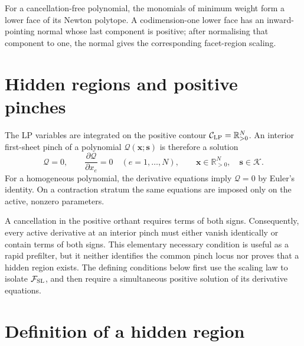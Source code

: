 \documentclass[a4paper,11pt]{article}
\newcommand{\x}{\boldsymbol{x}}
\newcommand{\s}{\boldsymbol{s}}
\newcommand{\K}{\mathcal K}
\newcommand{\FSL}{\mathcal F_{\rm SL}}
\begin{document}
For a cancellation-free polynomial, the monomials of minimum weight form a
lower face of its Newton polytope.  A codimension-one lower face has an
inward-pointing normal whose last component is positive; after normalising
that component to one, the normal gives the corresponding facet-region
scaling.

\section{Hidden regions and positive pinches}
\label{sec:pinch}

The LP variables are integrated on the positive contour
\(\mathcal C_{\rm LP}=\mathbb R_{>0}^{N}\).  An interior first-sheet pinch of
a polynomial \(\mathcal Q(\x;\s)\) is therefore a solution
\begin{equation}
 \mathcal Q=0,
 \qquad
 \frac{\partial\mathcal Q}{\partial x_e}=0
 \quad(e=1,\ldots,N),
 \qquad
 \x\in\mathbb R_{>0}^{N},\quad \s\in\K.
\label{eq:positive-pinch}
\end{equation}
For a homogeneous polynomial, the derivative equations imply
\(\mathcal Q=0\) by Euler's identity.  On a contraction stratum the same
equations are imposed only on the active, nonzero parameters.

A cancellation in the positive orthant requires terms of both signs.
Consequently, every active derivative at an interior pinch must either vanish
identically or contain terms of both signs.  This elementary necessary
condition is useful as a rapid prefilter, but it neither identifies the
common pinch locus nor proves that a hidden region exists.  The defining
conditions below first use the scaling law to isolate \(\FSL\), and then
require a simultaneous positive solution of its derivative equations.

\section{Definition of a hidden region}
\label{sec:definition}
\end{document}
